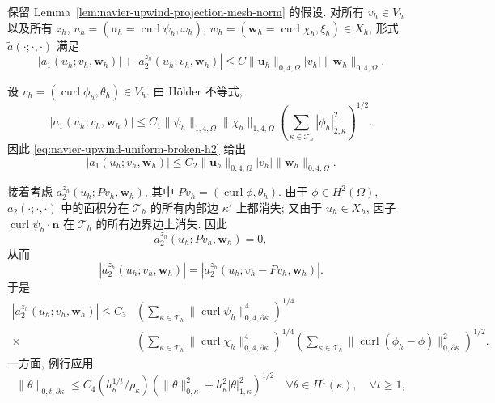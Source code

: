 \setcounter{statement}{1}
\begin{Lemma}\label{lem:navier-upwind-form-bounded}
保留 Lemma~\ref{lem:navier-upwind-projection-mesh-norm} 的假设. 对所有
$v_h\in V_h$ 以及所有
$z_h$, $u_h=(\boldsymbol u_h=\operatorname{curl}\psi_h,\omega_h)$,
$w_h=(\boldsymbol w_h=\operatorname{curl}\chi_h,\xi_h)\in X_h$, 形式
$\widetilde a(\mathord\cdot;\mathord\cdot,\mathord\cdot)$ 满足
\begin{equation}\label{eq:navier-upwind-form-bound}
|a_1(u_h;v_h,\boldsymbol w_h)|
+|a_2^{z_h}(u_h;v_h,\boldsymbol w_h)|
\leq C\|\boldsymbol u_h\|_{0,4,\Omega}|v_h|
\|\boldsymbol w_h\|_{0,4,\Omega}.
\end{equation}
\end{Lemma}
\begin{Proof}
设 $v_h=(\operatorname{curl}\phi_h,\theta_h)\in V_h$.
由 Hölder 不等式,
\[
|a_1(u_h;v_h,\boldsymbol w_h)|
\leq C_1\|\psi_h\|_{1,4,\Omega}\|\chi_h\|_{1,4,\Omega}
\left(\sum_{\kappa\in\mathcal T_h}|\phi_h|_{2,\kappa}^2\right)^{1/2}.
\]
因此 \eqref{eq:navier-upwind-uniform-broken-h2} 给出
\[
|a_1(u_h;v_h,\boldsymbol w_h)|
\leq C_2\|\boldsymbol u_h\|_{0,4,\Omega}|v_h|
\|\boldsymbol w_h\|_{0,4,\Omega}.
\]

接着考虑 $a_2^{z_h}(u_h;Pv_h,\boldsymbol w_h)$, 其中
$Pv_h=(\operatorname{curl}\phi,\theta_h)$. 由于 $\phi\in H^2(\Omega)$,
$a_2(\mathord\cdot;\mathord\cdot,\mathord\cdot)$ 中的面积分在
$\mathcal T_h$ 的所有内部边 $\kappa'$ 上都消失; 又由于 $u_h\in X_h$,
因子 $\operatorname{curl}\psi_h\cdot\boldsymbol n$ 在 $\mathcal T_h$ 的所有边界边上消失.
因此
\begin{equation}\label{eq:navier-upwind-smoothed-boundary-zero}
a_2^{z_h}(u_h;Pv_h,\boldsymbol w_h)=0,
\end{equation}
从而
\[
|a_2^{z_h}(u_h;v_h,\boldsymbol w_h)|
=|a_2^{z_h}(u_h;v_h-Pv_h,\boldsymbol w_h)|.
\]
于是
\[
\begin{aligned}
|a_2^{z_h}(u_h;v_h,\boldsymbol w_h)|
\leq C_3
&\left(\sum_{\kappa\in\mathcal T_h}
\|\operatorname{curl}\psi_h\|_{0,4,\partial\kappa}^4\right)^{1/4}\\
{}\times
&\left(\sum_{\kappa\in\mathcal T_h}
\|\operatorname{curl}\chi_h\|_{0,4,\partial\kappa}^4\right)^{1/4}
\left(\sum_{\kappa\in\mathcal T_h}
\|\operatorname{curl}(\phi_h-\phi)\|_{0,\partial\kappa}^2\right)^{1/2}.
\end{aligned}
\]
一方面, 例行应用
\[
\|\theta\|_{0,t,\partial\kappa}
\leq C_4(h_\kappa^{1/t}/\rho_\kappa)
(\|\theta\|_{0,\kappa}^2+h_\kappa^2|\theta|_{1,\kappa}^2)^{1/2}
\quad\forall\theta\in H^1(\kappa),\quad\forall t\geq1,
\]


\end{Proof}
